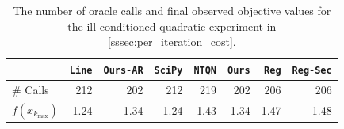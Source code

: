 \begin{table}[t]
    \centering
    \small
    \setlength{\tabcolsep}{3.5pt}
    \caption{The number of oracle calls and final observed objective values for the ill-conditioned quadratic experiment in \cref{sssec:per_iteration_cost}.}
    \label{tab:time_results}
    \begin{tabular}{lrrrrrrr}
    \toprule
                                & \texttt{Line} & \texttt{Ours-AR} & \texttt{SciPy} & \texttt{NTQN} & \texttt{Ours} & \texttt{Reg} & \texttt{Reg-Sec} \\
    \midrule
            \# Calls & 212 & 202 & 212 & 219 & 202 & 206 & 206 \\
    $\overline{f}(x_{k_{\max}})$ & 1.24 & 1.34 & 1.24 & 1.43 & 1.34 & 1.47 & 1.48 \\
    \bottomrule
    \end{tabular}
\end{table}
